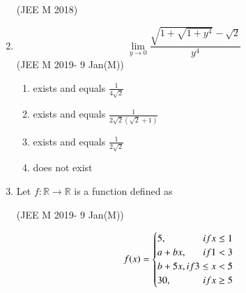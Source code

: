 \documentclass[journal,12pt,twocolumn]{IEEEtran}
\theoremstyle{remark}
\begin{document}
\begin{enumerate}
	\hfill{(JEE M 2018)}
	\begin{enumerate}[label=(\alph*)]
	\end{enumerate}
	\item  
	\[\lim_{y\to0} \frac{\sqrt{1+\sqrt{1+y^4}}-\sqrt{2}}{y^4} \]
	\hfill{(JEE M 2019- 9 Jan(M))}
	\begin{enumerate}[label=(\alph*)]
		\item exists and equals $\frac{1}{4\sqrt{2}}$
		\item exists and equals $\frac{1}{2\sqrt{2}(\sqrt{2}+1)}$
		\item exists and equals $\frac{1}{2\sqrt{2}}$
		\item does not exist
	\end{enumerate}
\item Let $f : \mathbb{R}\to\mathbb{R}$ is a function defined as

	\hfill{(JEE M 2019- 9 Jan(M))}

	\begin{equation}
	    f(x)= 
	    \begin{cases}
	    5, \hfill{if x \le 1}\\
	    a + bx, \hfill{if 1 < 3}\\
	    b + 5x, \hfill{if 3 \le x < 5}\\
	    30, \hfill{if x \ge 5}
	    \end{cases}
	\end{equation}


\end{enumerate}
\end{document}
